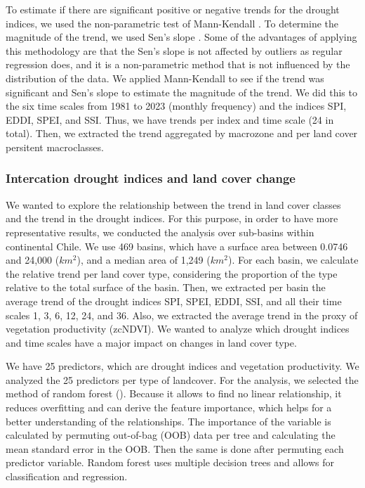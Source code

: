 \documentclass[
  authoryear,
  preprint,
  3p,
  onecolumn]{elsarticle}
\begin{document}
To estimate if there are significant positive or negative trends for the
drought indices, we used the non-parametric test of Mann-Kendall
\citep{Kendall1975}. To determine the magnitude of the trend, we used
Sen's slope \citep{Sen1968}. Some of the advantages of applying this
methodology are that the Sen's slope is not affected by outliers as
regular regression does, and it is a non-parametric method that is not
influenced by the distribution of the data. We applied Mann-Kendall to
see if the trend was significant and Sen's slope to estimate the
magnitude of the trend. We did this to the six time scales from 1981 to
2023 (monthly frequency) and the indices SPI, EDDI, SPEI, and SSI. Thus,
we have trends per index and time scale (24 in total). Then, we
extracted the trend aggregated by macrozone and per land cover persitent
macroclasses.

\hypertarget{intercation-drought-indices-and-land-cover-change}{%
\subsubsection{Intercation drought indices and land cover
change}\label{intercation-drought-indices-and-land-cover-change}}

We wanted to explore the relationship between the trend in land cover
classes and the trend in the drought indices. For this purpose, in order
to have more representative results, we conducted the analysis over
sub-basins within continental Chile. We use 469 basins, which have a
surface area between 0.0746 and 24,000 (\(km^2\)), and a median area of
1,249 (\(km^2\)). For each basin, we calculate the relative trend per
land cover type, considering the proportion of the type relative to the
total surface of the basin. Then, we extracted per basin the average
trend of the drought indices SPI, SPEI, EDDI, SSI, and all their time
scales 1, 3, 6, 12, 24, and 36. Also, we extracted the average trend in
the proxy of vegetation productivity (zcNDVI). We wanted to analyze
which drought indices and time scales have a major impact on changes in
land cover type.

We have 25 predictors, which are drought indices and vegetation
productivity. We analyzed the 25 predictors per type of landcover. For
the analysis, we selected the method of random forest (\citet{Ho1995}).
Because it allows to find no linear relationship, it reduces overfitting
and can derive the feature importance, which helps for a better
understanding of the relationships. The importance of the variable is
calculated by permuting out-of-bag (OOB) data per tree and calculating
the mean standard error in the OOB. Then the same is done after
permuting each predictor variable. Random forest uses multiple decision
trees and allows for classification and regression.
\end{document}
